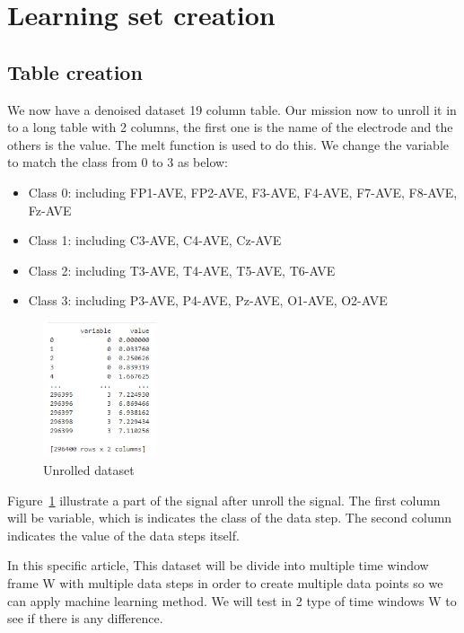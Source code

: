 \section{Learning set creation}
    \subsection{Table creation}
        We now have a denoised dataset 19 column table. Our mission now to unroll it in to a long table with 2 columns, the first one is the name of the electrode and the others is the value. The melt function is used to do this. We change the variable to match the class from 0 to 3 as below:
        
        \begin{itemize}
        \item Class 0: including FP1-AVE, FP2-AVE, F3-AVE, F4-AVE, F7-AVE, F8-AVE, Fz-AVE
        \item Class 1: including C3-AVE, C4-AVE, Cz-AVE
        \item Class 2: including T3-AVE, T4-AVE, T5-AVE, T6-AVE
        \item Class 3: including P3-AVE, P4-AVE, Pz-AVE, O1-AVE,  O2-AVE
    \end{itemize}

        \begin{figure}[h]
        \centering
        \includegraphics[width = 0.3\textwidth]{images/unroll.png}
        \caption{Unrolled dataset}
        \label{fig:unroll}
        \end{figure}
        
        Figure~\ref{fig:unroll} illustrate a part of the signal after unroll the signal. The first column will be variable, which is indicates the class of the data step. The second column indicates the value of the data steps itself.
      
      In this specific article, This dataset will be divide into multiple time window frame W with multiple data steps in order to create multiple data points so we can apply machine learning method. We will test in 2 type of time windows W to see if there is any difference.
      
